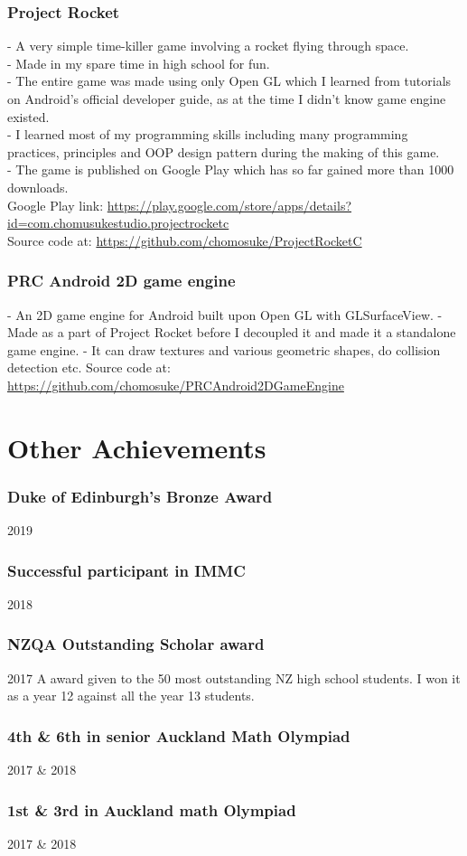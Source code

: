 \documentclass[9pt]{extarticle}
\begin{document}
\subsubsection*{Project Rocket}
- A very simple time-killer game involving a rocket flying through space.\\
- Made in my spare time in high school for fun.\\
- The entire game was made using only Open GL which I learned from tutorials on Android’s official developer guide, as at the time I didn’t know game engine existed.\\
- I learned most of my programming skills including many programming practices, principles and OOP design pattern during the making of this game.\\
- The game is published on Google Play which has so far gained more than 1000 downloads.\\
Google Play link: \url{https://play.google.com/store/apps/details?id=com.chomusukestudio.projectrocketc}\\
Source code at: \url{https://github.com/chomosuke/ProjectRocketC}

\subsubsection*{PRC Android 2D game engine}
- An 2D game engine for Android built upon Open GL with GLSurfaceView.
- Made as a part of Project Rocket before I decoupled it and made it a standalone game engine.
- It can draw textures and various geometric shapes, do collision detection etc.
Source code at: \url{https://github.com/chomosuke/PRCAndroid2DGameEngine}

\section*{Other Achievements}
\subsubsection*{Duke of Edinburgh's Bronze Award}
2019

\subsubsection*{Successful participant in IMMC}
2018

\subsubsection*{NZQA Outstanding Scholar award}
2017
A award given to the 50 most outstanding NZ high school students. I won it as a year 12 against all the year 13 students.

\subsubsection*{4th \& 6th in senior Auckland Math Olympiad}
2017 \& 2018

\subsubsection*{1st \& 3rd in Auckland math Olympiad}
2017 \& 2018
\end{document}
